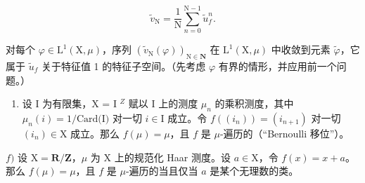 \[
\widetilde {v} _ {\mathrm{N}} = \frac {1}{\mathrm{N}} \sum_ {n = 0} ^ {\mathrm{N-1}} \widetilde {u} _ {f} ^ {n}.
\]

对每个 \(\varphi\in\mathrm{L}^{1}(\mathrm{X},\mu)\)，序列 \((\widetilde{v}_{\mathrm{N}}(\varphi))_{\mathrm{N}\in\mathbf{N}}\) 在 \(\mathrm{L}^{1}(\mathrm{X},\mu)\) 中收敛到元素 \(\widetilde{\varphi}\)，它属于 \(\widetilde{u}_{f}\) 关于特征值 1 的特征子空间。（先考虑 \(\varphi\) 有界的情形，并应用前一个问题。）

\begin{enumerate}
\def\labelenumi{\alph{enumi})}
\setcounter{enumi}{4}
\tightlist
\item
  设 I 为有限集，X = I \(^{Z}\) 赋以 I 上的测度 \(\mu_n\) 的乘积测度，其中 \(\mu_n(i) = 1/\text{Card(I)}\) 对一切 \(i \in \text{I}\) 成立。令 \(f((i_n)) = (i_{n+1})\) 对一切 \((i_n) \in \text{X}\) 成立。那么 \(f(\mu) = \mu\)，且 \(f\) 是 \(\mu\)-遍历的（“Bernoulli 移位”）。
\end{enumerate}

\(f)\) 设 \(\mathrm{X} = \mathbf{R} / \mathbf{Z}\)，\(\mu\) 为 \(\mathrm{X}\) 上的规范化 Haar 测度。设 \(a \in \mathrm{X}\)，令 \(f(x) = x + a\)。那么 \(f(\mu) = \mu\)，且 \(f\) 是 \(\mu\)-遍历的当且仅当 \(a\) 是某个无理数的类。

